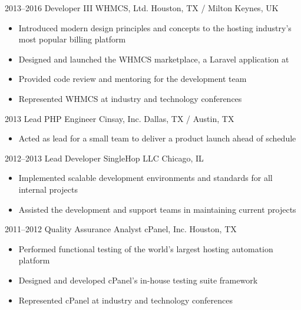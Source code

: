 \documentclass[11pt,a4paper,sans]{moderncv}
\begin{document}
    \cventry
      {2013--2016}
      {Developer III}
      {WHMCS, Ltd.}
      {Houston, TX / Milton Keynes, UK}
      {}
      {
        \begin{itemize}
          \item Introduced modern design principles and concepts to the hosting industry's most popular billing platform
          \item Designed and launched the WHMCS marketplace, a Laravel application at 
          \item Provided code review and mentoring for the development team
          \item Represented WHMCS at industry and technology conferences
        \end{itemize}
      }

    \cventry
      {2013}
      {Lead PHP Engineer}
      {Cinsay, Inc.}
      {Dallas, TX / Austin, TX}
      {}
      {
        \begin{itemize}
          \item Acted as lead for a small team to deliver a product launch ahead of schedule
        \end{itemize}
      }

    \cventry
      {2012--2013}
      {Lead Developer}
      {SingleHop LLC}
      {Chicago, IL}
      {}
      {
        \begin{itemize}
          \item Implemented scalable development environments and standards for all internal projects
          \item Assisted the development and support teams in maintaining current projects
        \end{itemize}
      }

    \cventry
      {2011--2012}
      {Quality Assurance Analyst}
      {cPanel, Inc.}
      {Houston, TX}
      {}
      {
        \begin{itemize}
          \item Performed functional testing of the world's largest hosting automation platform
          \item Designed and developed cPanel's in-house testing suite framework
          \item Represented cPanel at industry and technology conferences
        \end{itemize}
      }
\end{document}
